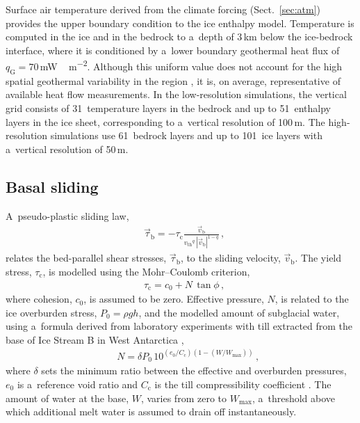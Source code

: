 \documentclass[tc, manuscript]{copernicus}
\begin{document}
      Surface air
      temperature derived from the climate forcing (Sect.~\ref{sec:atm})
      provides the upper boundary condition to the ice enthalpy
      model. Temperature is computed in the ice and in the bedrock to
      a~depth of 3\,\unit{km} below the ice-bedrock interface, where it is
      conditioned by a~lower boundary geothermal heat flux of
      $q_{\mathrm{G}}=70$\,\unit{mW\,m^{-2}}. Although this uniform value
      does
      not account for the high spatial geothermal variability in the region
      \citep{Blackwell.Richards.2004}, it is, on average, representative of
      available heat flow measurements. In the low-resolution simulations,
      the vertical grid consists of 31~temperature layers in the bedrock and
      up to 51~enthalpy layers in the ice sheet, corresponding to a~vertical
      resolution of 100\,\unit{m}. The high-resolution simulations use
      61~bedrock layers and up to 101~ice layers with a~vertical resolution
      of 50\,\unit{m}.

\subsection{Basal sliding}
\label{sec:sliding}

      A~pseudo-plastic sliding law,
%
\begin{align}
&\label{eqn:pseudoplastic}
    \vec{\tau}_{\mathrm{b}} = -\tau_{\mathrm{c}} \frac{\vec{v}_{\mathrm{b}}}{{v_{\text{th}}}^q\,|\vec{v}_{\mathrm{b}}|^{1-q}} \,,
\end{align}
%
      relates the bed-parallel shear stresses, $\vec{\tau}_{\mathrm{b}}$, to
      the sliding velocity, $\vec{v}_{\mathrm{b}}$.
      The yield stress, $\tau_{\mathrm{c}}$, is modelled using the
      Mohr--Coulomb criterion,
%
\begin{align}
&\tau_{\mathrm{c}} = c_0 + N\,\tan{\phi} \,,
\end{align}
%
      where cohesion, $c_0$, is assumed to be zero. Effective pressure, $N$,
      is related to the ice overburden stress, $P_0=\rho gh$, and the
      modelled amount of
      subglacial water, using a~formula derived from laboratory experiments
      with till extracted from the base of Ice Stream B in West Antarctica
      \citep{Tulaczyk.etal.2000, Bueler.Pelt.2015},
%
\begin{align}
&\label{eqn:ntil}
&N = \delta P_0 \, 10^{(e_0/C_{\mathrm{c}}) (1 - (W/W_{\text{max}}))} \,,
\end{align}
%
      where $\delta$ sets the minimum ratio between the effective and
      overburden pressures, $e_0$ is a~reference void ratio and
      $C_{\mathrm{c}}$ is the till compressibility coefficient
      \citep{Tulaczyk.etal.2000}. The amount of water at the base, $W$,
      varies from zero to $W_{\text{max}}$, a~threshold above which
      additional melt water is assumed to drain off instantaneously.
\end{document}
